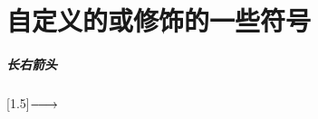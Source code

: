 \documentclass{ctexbook}
\begin{document}
\chapter{自定义的或修饰的一些符号}
\paragraph{长右箭头}
\scalebox{2}[1.5]{$\relbar\joinrel\longrightarrow$}
\end{document}
